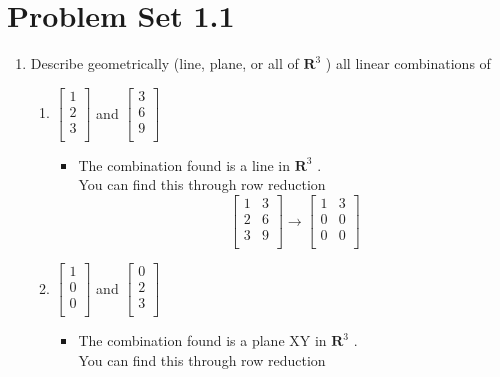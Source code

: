 \documentclass[12pt,letterpaper]{article}
\begin{document}
\section{Problem Set 1.1} 
\begin{enumerate}
    \item Describe geometrically (line, plane, or all of $\textbf{R}^3$ ) all linear combinations of 
    \begin{enumerate}
        \item $\begin{bmatrix}
1 \\
2 \\
3 \\
\end{bmatrix}$ and $\begin{bmatrix}
3 \\
6 \\
9 \\
\end{bmatrix}$
\begin{itemize}
    \item  The combination found is a line in $\textbf{R}^3$ . \\You can find this through row reduction
$$\begin{bmatrix} 
1 & 3\\
2 & 6\\
3 & 9\\
\end{bmatrix} \rightarrow \begin{bmatrix} 
1 & 3\\
0 & 0\\
0 & 0\\
\end{bmatrix}$$
\end{itemize}
        \item $\begin{bmatrix}
1 \\
0 \\
0 \\
\end{bmatrix}$ and $\begin{bmatrix}
0 \\
2 \\
3 \\
\end{bmatrix}$
    \begin{itemize}
        \item The combination found is a plane XY in $\textbf{R}^3$ . \\You can find this through row reduction

\end{itemize}
\end{enumerate}
\end{enumerate}
\end{document}
